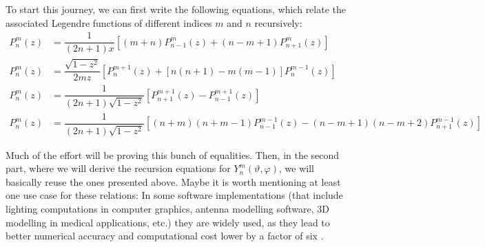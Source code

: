 To start this journey, we can first write the following equations, which relate
the associated Legendre functions of different indices $m$ and $n$ recursively:
\begin{subequations}
  \begin{align}
    P^m_n(z) &= \dfrac{1}{(2n+1)x} \left[
       (m+n) P^m_{n-1}(z) + (n-m+1) P^m_{n+1}(z)
     \right] \label{kugel:eqn:rec-leg-1} \\
    P^m_n(z) &= \dfrac{\sqrt{1-z^2}}{2mz} \left[
        P^{m+1}_n(z) + [n(n+1)-m(m-1)] P^{m-1}_n(z)
      \right] \label{kugel:eqn:rec-leg-2} \\ 
    P^m_n(z) &= \dfrac{1}{(2n+1)\sqrt{1-z^2}} \left[
        P^{m+1}_{n+1}(z) - P^{m+1}_{n-1}(z)
      \right] \label{kugel:eqn:rec-leg-3} \\
    P^m_n(z) &= \dfrac{1}{(2n+1)\sqrt{1-z^2}} \left[
        (n+m)(n+m-1)P^{m-1}_{n-1}(z) - (n-m+1)(n-m+2)P^{m-1}_{n+1}(z)
      \right] \label{kugel:eqn:rec-leg-4}
  \end{align}
\end{subequations}

Much of the effort will be proving this bunch of equalities. Then, in the second
part, where we will derive the recursion equations for
$Y^m_n(\vartheta,\varphi)$, we will basically reuse the ones presented above.
Maybe it is worth mentioning at least one use case for these relations: In some
software implementations (that include lighting computations in computer
graphics, antenna modelling software, 3D modelling in medical applications,
etc.) they are widely used, as they lead to better numerical accuracy and
computational cost lower by a factor of six \cite{davari_new_2013}.

